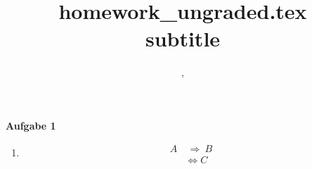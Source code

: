 \documentclass[12pt,a4paper]{article}
\title{\textbf{homework_ungraded.tex}\\[0.2em]\smaller{}subtitle}
\author{\namea, \\ \nameb}
\date{\dateheader}
\newcommand{\Ra}{{\ \Rightarrow \ }}
\newcommand{\Lrani}{\Leftrightarrow}
\newcommand{\assignment}[1]{
	{
		\vspace*{0.5cm}
		\noindent\Large{\textbf{Aufgabe #1}}
		\vspace*{0.2cm}
		\newline
	}
}
\newenvironment{enumbf}{
	\vspace{-5mm}
	\begin{enumerate}
		\renewcommand{\labelenumi}{\textbf{(\alph{enumi})}}
	}{\end{enumerate}}
\begin{document}
	\assignment{1}
	\begin{enumbf}
		\item
		\begin{align*}
		A &\Ra B\\
		&\Lrani C
		\end{align*}
	\end{enumbf}
\end{document}

